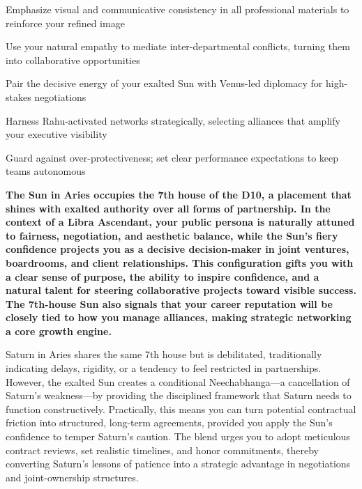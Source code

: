 \begin{diamondlist}
  \item {\fontsize{8.5}{12}\selectfont Emphasize visual and communicative consistency in all professional materials to reinforce your refined image}
  \item {\fontsize{8.5}{12}\selectfont Use your natural empathy to mediate inter-departmental conflicts, turning them into collaborative opportunities}
  \item {\fontsize{8.5}{12}\selectfont Pair the decisive energy of your exalted Sun with Venus-led diplomacy for high-stakes negotiations}
  \item {\fontsize{8.5}{12}\selectfont Harness Rahu-activated networks strategically, selecting alliances that amplify your executive visibility}
  \item {\fontsize{8.5}{12}\selectfont Guard against over-protectiveness; set clear performance expectations to keep teams autonomous}
\end{diamondlist}


\label{topic29}

{\fontsize{9.5}{13.8}\selectfont\bfseries\color{DeepSlate} The Sun in Aries occupies the 7th house of the D10, a placement that shines with exalted authority over all forms of partnership. In the context of a Libra Ascendant, your public persona is naturally attuned to fairness, negotiation, and aesthetic balance, while the Sun's fiery confidence projects you as a decisive decision-maker in joint ventures, boardrooms, and client relationships. This configuration gifts you with a clear sense of purpose, the ability to inspire confidence, and a natural talent for steering collaborative projects toward visible success. The 7th-house Sun also signals that your career reputation will be closely tied to how you manage alliances, making strategic networking a core growth engine.}\par\vspace{2mm}

{\fontsize{9}{13}\selectfont Saturn in Aries shares the same 7th house but is debilitated, traditionally indicating delays, rigidity, or a tendency to feel restricted in partnerships. However, the exalted Sun creates a conditional Neechabhanga---a cancellation of Saturn's weakness---by providing the disciplined framework that Saturn needs to function constructively. Practically, this means you can turn potential contractual friction into structured, long-term agreements, provided you apply the Sun's confidence to temper Saturn's caution. The blend urges you to adopt meticulous contract reviews, set realistic timelines, and honor commitments, thereby converting Saturn's lessons of patience into a strategic advantage in negotiations and joint-ownership structures.}\par\vspace{1.8mm}

